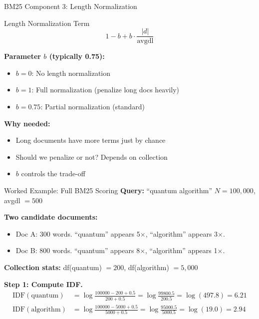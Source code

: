 \documentclass[aspectratio=169]{beamer}
\begin{document}
\begin{frame}[shrink=5]{BM25 Component 3: Length Normalization}
\begin{block}{Length Normalization Term}
$$1 - b + b \cdot \frac{|d|}{\text{avgdl}}$$
\end{block}

\textbf{Parameter $b$ (typically 0.75):}
\begin{itemize}
    \item $b = 0$: No length normalization
    \item $b = 1$: Full normalization (penalize long docs heavily)
    \item $b = 0.75$: Partial normalization (standard)
\end{itemize}

\vspace{1em}

\textbf{Why needed:}
\begin{itemize}
    \item Long documents have more terms just by chance
    \item Should we penalize or not? Depends on collection
    \item $b$ controls the trade-off
\end{itemize}
\end{frame}



\begin{frame}[shrink=10]{Worked Example: Full BM25 Scoring}
\textbf{Query:} ``quantum algorithm'' \quad $N = 100{,}000$, avgdl $= 500$

\vspace{0.5em}

\textbf{Two candidate documents:}
\begin{itemize}
    \item Doc A: 300 words. ``quantum'' appears 5$\times$, ``algorithm'' appears 3$\times$.
    \item Doc B: 800 words. ``quantum'' appears 8$\times$, ``algorithm'' appears 1$\times$.
\end{itemize}

\textbf{Collection stats:} df(quantum) $= 200$, df(algorithm) $= 5{,}000$

\vspace{0.5em}

\textbf{Step 1: Compute IDF.}
\begin{align*}
\text{IDF}(\text{quantum}) &= \log\frac{100000 - 200 + 0.5}{200 + 0.5} = \log\frac{99800.5}{200.5} = \log(497.8) = \mathbf{6.21} \\
\text{IDF}(\text{algorithm}) &= \log\frac{100000 - 5000 + 0.5}{5000 + 0.5} = \log\frac{95000.5}{5000.5} = \log(19.0) = \mathbf{2.94}
\end{align*}
\end{frame}
\end{document}
